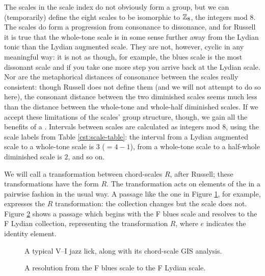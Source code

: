 The scales in the scale index do not obviously form a group, but we can
(temporarily) define the eight scales to be isomorphic to $\mathbb{Z}_8$, the
integers mod 8. The scales do form a progression from consonance to
dissonance, and for Russell it is true that the whole-tone scale is in some
sense further away from the Lydian tonic than the Lydian augmented
scale. They are not, however, cyclic in any meaningful way: it is
not as though, for example, the blues scale is the most dissonant scale and if
you take one more step you arrive back at the Lydian scale. Nor are the
metaphorical distances of consonance between the scales really consistent:
though Russell does not define them (and we will not attempt to do so here), the
consonant distance between the two diminished scales seems much less than the
distance between the whole-tone and whole-half diminished scales.
If we accept these limitations of the scales' group structure, though, we gain
all the benefits of a \gis. Intervals between scales are calculated as
integers mod 8, using the scale labels from Table \ref{cst:scale-table}: the
interval from a Lydian augmented scale to a whole-tone scale is $3$ ($=4-1$),
from a whole-tone scale to a half-whole diminished scale is $2$, and so on.

We will call a transformation between chord-scales $R$, after Russell; these
transformations have the form $R$. The transformation acts on
elements of the \gis in a pairwise fashion in the usual way.
A passage like the one in Figure \ref{cst:gis-fiveone}, for example, expresses the
$R$ transformation: the collection changes but the scale does not.
Figure \ref{cst:gis-blues-lyd} shows a passage which begins with the F blues
scale and resolves to the F Lydian collection, representing the transformation
$R$, where $e$ indicates the identity element.

\begin{figure}[tbp]
  \caption{A typical V--I jazz lick, along with its chord-scale \textsc{GIS}
    analysis.}
  \label{cst:gis-fiveone}
\end{figure}

\begin{figure}[tbp]
  \caption{A resolution from the F blues scale to the F Lydian scale.}
  \label{cst:gis-blues-lyd}
\end{figure}

